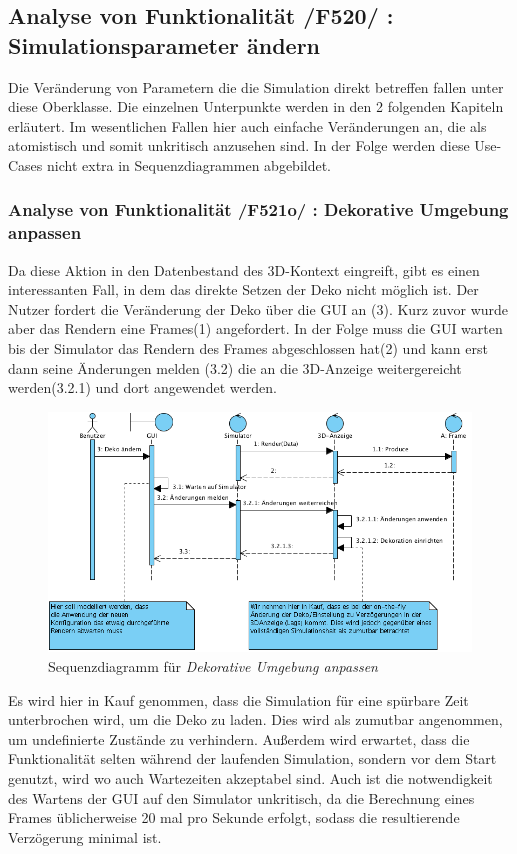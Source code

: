 \subsection{Analyse von Funktionalität /F520/ :  Simulationsparameter ändern}
Die Veränderung von Parametern die die Simulation direkt betreffen fallen unter diese Oberklasse. Die einzelnen Unterpunkte werden in den 2 folgenden Kapiteln erläutert. Im wesentlichen Fallen hier 
auch einfache Veränderungen an, die als atomistisch und somit unkritisch anzusehen sind. In der Folge werden diese Use-Cases nicht extra in Sequenzdiagrammen abgebildet.
\subsubsection{Analyse von Funktionalität /F521o/ :  Dekorative Umgebung anpassen}
Da diese Aktion in den Datenbestand des 3D-Kontext eingreift, gibt es einen interessanten Fall, in dem das direkte Setzen der Deko nicht möglich ist. 
Der Nutzer fordert die Veränderung der Deko über die GUI an (3). Kurz zuvor wurde aber das Rendern eine Frames(1) angefordert. 
In der Folge muss die GUI warten bis der Simulator das Rendern des Frames abgeschlossen hat(2) und kann erst dann seine Änderungen melden (3.2) die an die 3D-Anzeige weitergereicht werden(3.2.1) und dort angewendet werden.

\begin{figure}[h!]
\includegraphics[width=\linewidth]{bilder/change_graphic_deko}
\caption{Sequenzdiagramm für \textit{Dekorative Umgebung anpassen}}
\end{figure}
Es wird hier in Kauf genommen, dass die Simulation für eine spürbare Zeit unterbrochen wird, um die Deko zu laden. Dies wird als zumutbar angenommen, um undefinierte Zustände zu verhindern. 
Außerdem wird erwartet, dass die Funktionalität selten während der laufenden Simulation, sondern vor dem Start genutzt, wird wo auch Wartezeiten akzeptabel sind.
Auch ist die notwendigkeit des Wartens der GUI auf den Simulator unkritisch, da die Berechnung eines Frames üblicherweise 20 mal pro Sekunde erfolgt, sodass die resultierende Verzögerung minimal ist.

